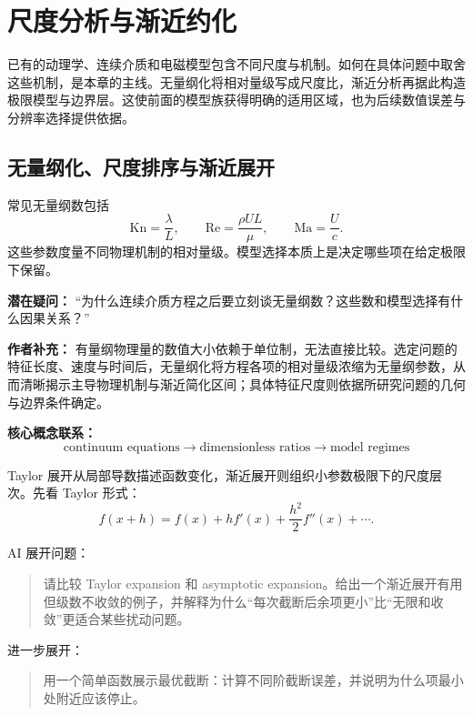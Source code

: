 \chapter{尺度分析与渐近约化}\label{ch:4}

\begin{chaptersummary}
已有的动理学、连续介质和电磁模型包含不同尺度与机制。如何在具体问题中取舍这些机制，是本章的主线。无量纲化将相对量级写成尺度比，渐近分析再据此构造极限模型与边界层。这使前面的模型族获得明确的适用区域，也为后续数值误差与分辨率选择提供依据。
\end{chaptersummary}

\section{无量纲化、尺度排序与渐近展开}
常见无量纲数包括
\[
\mathrm{Kn}=\frac{\lambda}{L},
\qquad
\mathrm{Re}=\frac{\rho UL}{\mu},
\qquad
\mathrm{Ma}=\frac{U}{c}.
\]
这些参数度量不同物理机制的相对量级。模型选择本质上是决定哪些项在给定极限下保留。

\begin{authornote}
\textbf{潜在疑问：}
“为什么连续介质方程之后要立刻谈无量纲数？这些数和模型选择有什么因果关系？”

\textbf{作者补充：}
有量纲物理量的数值大小依赖于单位制，无法直接比较。选定问题的特征长度、速度与时间后，无量纲化将方程各项的相对量级浓缩为无量纲参数，从而清晰揭示主导物理机制与渐近简化区间；具体特征尺度则依据所研究问题的几何与边界条件确定。

\textbf{核心概念联系：}
\[
\text{continuum equations}
\longrightarrow
\text{dimensionless ratios}
\longrightarrow
\text{model regimes}
\]
\end{authornote}

Taylor 展开从局部导数描述函数变化，渐近展开则组织小参数极限下的尺度层次。先看 Taylor 形式：
\[
f(x+h)
=
f(x)+hf'(x)+\frac{h^2}{2}f''(x)+\cdots.
\]

\begin{askai}
AI 展开问题：
\begin{quote}
请比较 Taylor expansion 和 asymptotic expansion。给出一个渐近展开有用但级数不收敛的例子，并解释为什么“每次截断后余项更小”比“无限和收敛”更适合某些扰动问题。
\end{quote}

进一步展开：
\begin{quote}
用一个简单函数展示最优截断：计算不同阶截断误差，并说明为什么项最小处附近应该停止。
\end{quote}
\end{askai}

